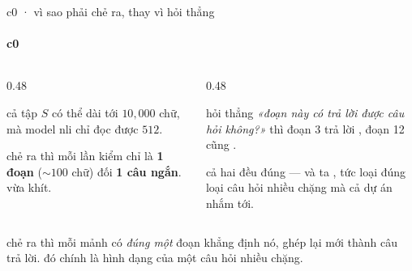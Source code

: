 \begin{frame}{c0 · vì sao phải chẻ ra, thay vì hỏi thẳng}
  \framesubtitle{c0}

  \begin{columns}[t]
  \begin{column}{0.48\textwidth}
    \begin{bx}[title={lý do 1 · độ dài}]
      cả tập $S$ có thể dài tới $10{,}000$ chữ, mà model nli chỉ đọc được $512$.
      \vspace{0.4em}

      chẻ ra thì mỗi lần kiểm chỉ là \textbf{1 đoạn} (${\sim}100$ chữ) đối
      \textbf{1 câu ngắn}. vừa khít.
    \end{bx}
  \end{column}
  \begin{column}{0.48\textwidth}
    \begin{badb}[title={lý do 2 · bắc cầu}]
      hỏi thẳng \emph{«đoạn này có trả lời được câu hỏi không?»} thì đoạn 3 trả
      lời , đoạn 12 cũng .
      \vspace{0.4em}

      cả hai đều đúng — và ta , tức loại đúng loại câu hỏi
      nhiều chặng mà cả dự án nhắm tới.
    \end{badb}
  \end{column}
  \end{columns}

  \vspace{0.7em}
  \begin{keyb}
    chẻ ra thì mỗi mảnh có \emph{đúng một} đoạn khẳng định nó, ghép lại mới thành
    câu trả lời. đó chính là hình dạng của một câu hỏi nhiều chặng.
  \end{keyb}
\end{frame}

